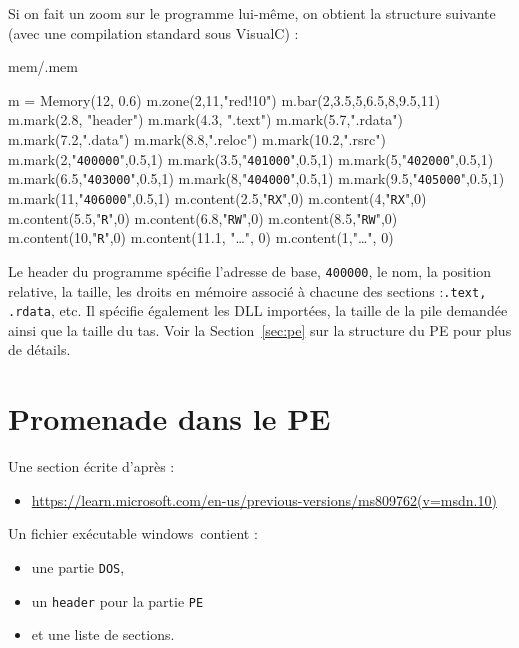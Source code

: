 \documentclass{book}
\newcounter{Qcours}
\newenvironment{memory}{%
	\noindent
	\VerbatimEnvironment\stepcounter{Qcours}%
	\begin{VerbatimOut}{mem/\theQcours.mem}%
	}{\end{VerbatimOut}%
}
\newcommand{\code}[1]{\texttt{#1}}
\newcommand{\Windows}{{\sc windows}}
\begin{document}
Si on fait un zoom sur le programme lui-même, on obtient la structure suivante (avec une compilation standard sous VisualC) : 

\bigskip
\begin{memory}
m = Memory(12, 0.6)
m.zone(2,11,"red!10")
m.bar(2,3.5,5,6.5,8,9.5,11)
m.mark(2.8, "header")
m.mark(4.3, ".text")
m.mark(5.7,".rdata")
m.mark(7.2,".data")
m.mark(8.8,".reloc")
m.mark(10.2,".rsrc")
m.mark(2,"\code{400000}",0.5,1)
m.mark(3.5,"\code{401000}",0.5,1)
m.mark(5,"\code{402000}",0.5,1)
m.mark(6.5,"\code{403000}",0.5,1)
m.mark(8,"\code{404000}",0.5,1)
m.mark(9.5,"\code{405000}",0.5,1)
m.mark(11,"\code{406000}",0.5,1)
m.content(2.5,"\code{RX}",0)
m.content(4,"\code{RX}",0)
m.content(5.5,"\code{R}",0)
m.content(6.8,"\code{RW}",0)
m.content(8.5,"\code{RW}",0)
m.content(10,"\code{R}",0)
m.content(11.1, "\ldots", 0)
m.content(1,"\ldots", 0)
\end{memory}

Le header du programme spécifie l'adresse de base, \code{400000}, le nom, la position relative, la taille, les droits en mémoire associé à chacune des sections :\code{.text, .rdata}, etc. Il spécifie également les DLL importées, la taille de la pile demandée ainsi que la taille du tas. Voir la Section~\ref{sec:pe} sur la structure du PE pour plus de détails. 


\section{Promenade dans le PE}

Une section écrite d'après : 
\begin{itemize}
	\item \url{https://learn.microsoft.com/en-us/previous-versions/ms809762(v=msdn.10)}
\end{itemize}

Un fichier exécutable \Windows\ contient : 
\begin{itemize}
	\item une partie \code{DOS},
	\item un \code{header} pour la partie \code{PE}
	\item et une liste de sections.
\end{itemize} 
\end{document}
